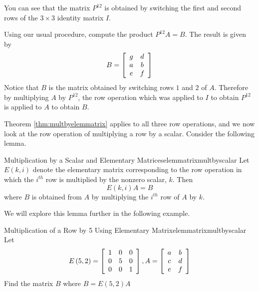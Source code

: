 \begin{solution}
You can see that the matrix $P^{12}$ is obtained by switching the first and second rows of the $3 \times 3$ identity matrix $I$.

Using our usual procedure, compute the product $P^{12}A = B$. The result is given by
\begin{equation*}
B =\left[
\begin{array}{cc}
g & d \\
a & b \\
e & f
\end{array}
\right]
\end{equation*}
Notice that $B$ is the matrix obtained by switching rows $1$ and $2$ of $A$. Therefore by  multiplying 
$A$ by $P^{12}$, the row operation which was applied to $I$ to obtain $P^{12}$ is applied to $A$ to obtain $B$. 
\end{solution}

Theorem \ref{thm:multbyelemmatrix} applies to all three row operations, and we now 
look at the row operation of multiplying a row by a scalar.  Consider the following lemma.

\begin{lemma}{Multiplication by a Scalar and Elementary Matrices}{elemmatrixmultbyscalar}
Let $E\left( k,i\right) $ denote the elementary matrix
corresponding to the row operation in which the $i^{th}$ row is multiplied
by the nonzero scalar, $k.$  Then
\begin{equation*}
E\left( k,i\right) A=B
\end{equation*}
where $B$ is obtained from $A$ by multiplying the $i^{th}$ row of $A$ by $k$.
\end{lemma}

We will explore this lemma further in the following example.

\begin{example}{Multiplication of a Row by 5 Using Elementary Matrix}{elemmatrixmultbyscalar}
Let
\begin{equation*}
E \left(5, 2\right) = \left[
\begin{array}{rrr}
1 & 0 & 0 \\
0 & 5 & 0 \\
0 & 0 & 1
\end{array}
\right], A =  \left[
\begin{array}{cc}
a & b \\
c & d \\
e & f
\end{array}
\right]
\end{equation*}
Find the matrix $B$ where $B = E \left(5, 2\right)A$
\end{example}

